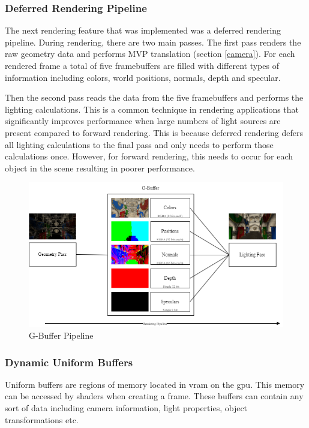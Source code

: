 \documentclass[11pt]{article}
\begin{document}
\subsubsection{Deferred Rendering Pipeline}
The next rendering feature that was implemented was a deferred rendering
pipeline. During rendering, there are two main passes. The first pass renders
the raw geometry data and performs MVP translation (section \ref{camera}). For
each rendered frame a total of five framebuffers are filled with different types of
information including colors, world positions, normals, depth and specular.

Then the second pass reads the data from the five framebuffers and performs the
lighting calculations. This is a common technique in rendering applications that
significantly improves performance when large numbers of light sources are
present compared to forward rendering. This is because deferred rendering defers
all lighting calculations to the final pass and only needs to perform those
calculations once. However, for forward rendering, this needs to occur for each
object in the scene resulting in poorer performance.

\begin{figure}[H]
  \centering
  \includegraphics[width=\textwidth]{images/g_buffer.png}
  \caption{G-Buffer Pipeline}
  \label{fig:g_buffer}
\end{figure}



\subsubsection{Dynamic Uniform Buffers}
Uniform buffers are regions of memory located in \gls*{vram} on the \gls*{gpu}.
This memory can be accessed by shaders when creating a frame. These buffers can
contain any sort of data including camera information, light properties, object
transformations etc.
\end{document}
